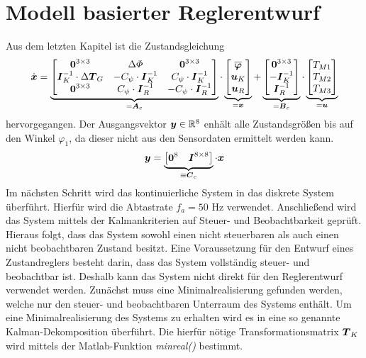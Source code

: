 \section{Modell basierter Reglerentwurf}
Aus dem letzten Kapitel ist die Zustandsgleichung
\begin{equation}
\dot{\boldsymbol{x}} = \underbrace{\begin{bmatrix}
\boldsymbol{0}^{3\times 3} & \Delta\varPhi & \boldsymbol{0}^{3\times 3} 
\\
\boldsymbol{I}_K^{-1}\cdot\Delta\boldsymbol{T}_G & -C_{\psi}\cdot\boldsymbol{I}^{-1}_K & C_{\psi}\cdot\boldsymbol{I}^{-1}_K
\\
\boldsymbol{0}^{3\times 3} & C_{\psi}\cdot\boldsymbol{I}^{-1}_R & -C_{\psi}\cdot\boldsymbol{I}^{-1}_R
\end{bmatrix}}_{=\boldsymbol{A}_c} \cdot \underbrace{\begin{bmatrix}
\boldsymbol{\overline{\varphi}} 
\\
\boldsymbol{u}_K \\
\boldsymbol{u}_R
\end{bmatrix}}_{=\boldsymbol{x}}
+
\underbrace{\begin{bmatrix}
\boldsymbol{0}^{3\times 3}
\\
-\boldsymbol{I}^{-1}_K
\\
\boldsymbol{I}^{-1}_R
\end{bmatrix}}_{=\boldsymbol{B}_c}\cdot \underbrace{\begin{bmatrix}
T_{M1} \\ T_{M2} \\ T_{M3}
\end{bmatrix}}_{=\boldsymbol{u}}
\end{equation}
hervorgegangen. Der Ausgangsvektor $\boldsymbol{y}\in \mathbb{R}^8$ enhält alle Zustandsgrößen bis auf den Winkel $\varphi_1$, da dieser nicht aus den Sensordaten ermittelt werden kann.
\begin{equation}
\boldsymbol{y} = \underbrace{\begin{bmatrix}
\boldsymbol{0}^8 & \boldsymbol{I}^{8\times 8}
\end{bmatrix}}_{\equiv \boldsymbol{C}_c} \cdot \boldsymbol{x}
\end{equation}
Im nächsten Schritt wird das kontinuierliche System  in das diskrete System  überführt. Hierfür wird die Abtastrate $f_a = 50\text{ Hz}$ verwendet.
Anschließend wird das System mittels der Kalmankriterien auf Steuer- und Beobachtbarkeit geprüft. Hieraus folgt, dass das System sowohl einen nicht steuerbaren als auch einen nicht beobachtbaren Zustand besitzt. Eine Voraussetzung für den Entwurf eines Zustandreglers besteht darin, dass das System vollständig steuer- und beobachtbar ist. Deshalb kann das System  nicht direkt für den Reglerentwurf verwendet werden. Zunächst muss eine Minimalrealisierung  gefunden werden, welche nur den steuer- und beobachtbaren Unterraum des Systems enthält. Um eine Minimalrealisierung des Systems zu erhalten wird es in eine so genannte Kalman-Dekomposition  überführt. Die hierfür nötige Transformationsmatrix $\boldsymbol{T}_K$ wird mittels der Matlab-Funktion \textit{minreal()} bestimmt.
